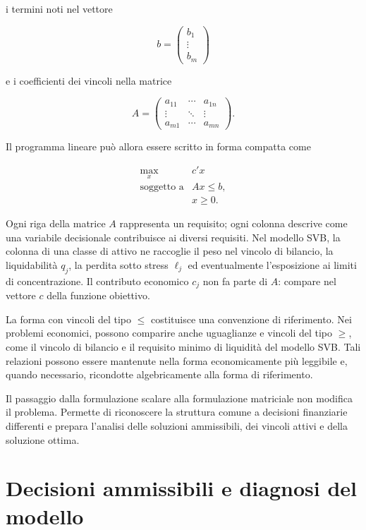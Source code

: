 \noindent i termini noti nel vettore

\[
b=
\begin{pmatrix}
b_1\\
\vdots\\
b_m
\end{pmatrix}
\]

\noindent e i coefficienti dei vincoli nella matrice

\[
A=
\begin{pmatrix}
a_{11} & \cdots & a_{1n}\\
\vdots & \ddots & \vdots\\
a_{m1} & \cdots & a_{mn}
\end{pmatrix}.
\]

Il programma lineare pu\`o allora essere scritto in forma compatta come

\[
\begin{array}{ll}
\max\limits_x
&
c'x
\\[4pt]
\mbox{soggetto a}
&
Ax\leq b,
\\[2pt]
&
x\geq0.
\end{array}
\]

Ogni riga della matrice $A$ rappresenta un requisito; ogni colonna descrive
come una variabile decisionale contribuisce ai diversi requisiti. Nel modello
SVB, la colonna di una classe di attivo ne raccoglie il peso nel vincolo di
bilancio, la liquidabilit\`a $q_j$, la perdita sotto stress $\ell_j$ ed
eventualmente l'esposizione ai limiti di concentrazione. Il contributo
economico $c_j$ non fa parte di $A$: compare nel vettore $c$ della funzione
obiettivo.

La forma con vincoli del tipo $\leq$ costituisce una convenzione di
riferimento. Nei problemi economici, possono comparire anche uguaglianze e
vincoli del tipo $\geq$, come il vincolo di bilancio e il requisito minimo di
liquidit\`a del modello SVB. Tali relazioni possono essere mantenute nella
forma economicamente pi\`u leggibile e, quando necessario, ricondotte
algebricamente alla forma di riferimento.

Il passaggio dalla formulazione scalare alla formulazione matriciale non
modifica il problema. Permette di riconoscere la struttura comune a decisioni
finanziarie differenti e prepara l'analisi delle soluzioni ammissibili, dei
vincoli attivi e della soluzione ottima.

\section{Decisioni ammissibili e diagnosi del modello}

